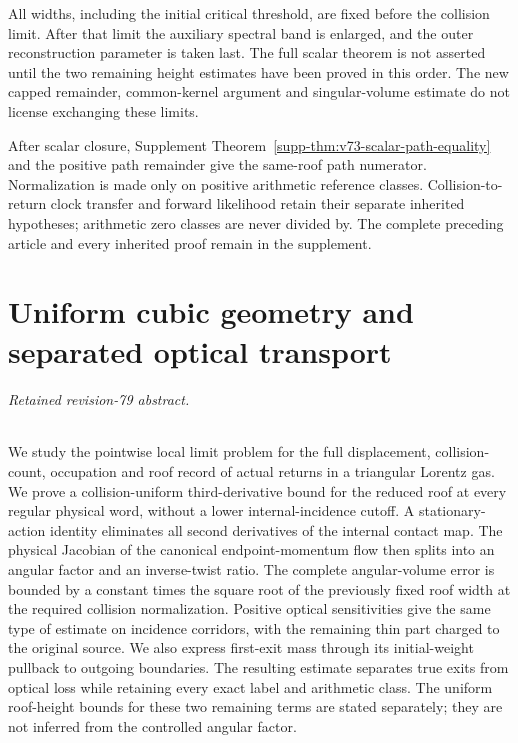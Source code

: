 \documentclass[11pt,reqno]{amsart}
\numberwithin{equation}{section}
\theoremstyle{definition}\newtheorem{definition}[theorem]{Definition}
\theoremstyle{remark}\newtheorem{remark}[theorem]{Remark}
\theoremstyle{definition}\newtheorem{inputstatement}[theorem]{Input statement}
\begin{document}
All widths, including the initial critical threshold, are fixed
before the collision limit. After that limit the auxiliary spectral
band is enlarged, and the outer reconstruction parameter is taken
last. The full scalar theorem is not asserted until the two remaining
height estimates have been proved in this order. The new capped
remainder, common-kernel argument and singular-volume estimate do not
license exchanging these limits.

After scalar closure, Supplement
Theorem~\ref{supp-thm:v73-scalar-path-equality} and the positive path
remainder give the same-roof path numerator. Normalization is made
only on positive arithmetic reference classes. Collision-to-return
clock transfer and forward likelihood retain their separate inherited
hypotheses; arithmetic zero classes are never divided by. The complete
preceding article and every inherited proof remain in the supplement.


\endgroup
\part{Uniform cubic geometry and separated optical transport}
\begingroup
\let\ArchiveLabel\label
\let\ArchiveRef\ref
\renewcommand{\label}[1]{\ArchiveLabel{v79archive:#1}}
\renewcommand{\ref}[1]{\ArchiveRef{v79archive:#1}}
\makeatletter
\let\ltx@label\label
\makeatother
\paragraph{Retained revision-79 abstract.}

We study the pointwise local limit problem for the full displacement,
collision-count, occupation and roof record of actual returns in a
triangular Lorentz gas. We prove a collision-uniform third-derivative
bound for the reduced roof at every regular physical word, without a
lower internal-incidence cutoff. A stationary-action identity eliminates
all second derivatives of the internal contact map. The physical
Jacobian of the canonical endpoint-momentum flow then splits into an
angular factor and an inverse-twist ratio. The complete angular-volume
error is bounded by a constant times the square root of the previously
fixed roof width at the required collision normalization. Positive
optical sensitivities give the same type of estimate on incidence
corridors, with the remaining thin part charged to the original source.
We also express first-exit mass through its initial-weight pullback to
outgoing boundaries. The resulting estimate separates true exits from
optical loss while retaining every exact label and arithmetic class.
The uniform roof-height bounds for these two remaining terms are stated
separately; they are not inferred from the controlled angular factor.
\end{document}
